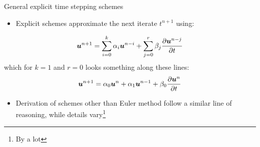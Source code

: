 \documentclass[presentation]{beamer}
\newcommand{\gv}[1]{\ensuremath{\mbox{\boldmath$ #1 $}}}
\begin{document}
\begin{frame}[label={sec:orge1160f9}]{General explicit time stepping schemes}
\begin{itemize}
\item Explicit schemes approximate the next iterate \(t^{n+1}\) using:
\end{itemize}
\[ \gv{u}^{n+1} = \sum_{i=0}^{k} \alpha_i \gv{u}^{n-i} + \sum_{j=0}^{r} \beta_j \frac{\partial \gv{u}^{n-j}}{\partial t} \]
  which for \(k=1\) and \(r=0\) looks something along these lines:
\[ \gv{u}^{n+1} = \alpha_0 \gv{u}^{n} + \alpha_1 \gv{u}^{n-1} + \beta_0 \frac{\partial \gv{u}^{n}}{\partial t} \]
\begin{itemize}
\item Derivation of schemes other than Euler method follow a similar line of reasoning, while
details vary\footnote{By a \alert{lot}}
\end{itemize}
\end{frame}
\end{document}

